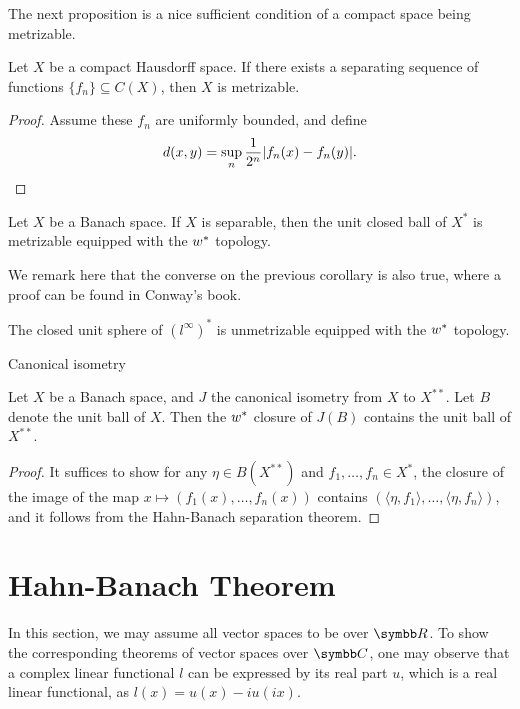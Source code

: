 The next proposition is a nice sufficient condition of a compact space being metrizable.

\begin{proposition}
  Let $X$ be a compact Hausdorff space. If there exists a separating sequence of functions $\{f_n\}\subseteq C(X)$, then $X$ is metrizable.
\end{proposition}

\begin{proof}
  Assume these $f_n$ are uniformly bounded, and define
  \begin{equation*}
    d(x, y)=\sup_{n} \frac{1}{2^n}\vert f_n(x)-f_n(y)\vert.
  \end{equation*}
\end{proof}

\begin{corollary}
  Let $X$ be a Banach space. If $X$ is separable, then the unit closed ball of $X^*$ is metrizable equipped with the $w^*$ topology.
\end{corollary}

We remark here that the converse on the previous corollary is also true, where a proof can be found in Conway's book.

\begin{example}
  The closed unit sphere of $(l^\infty)^*$ is unmetrizable equipped with the $w^*$ topology.
\end{example}

Canonical isometry

\begin{proposition}[Goldstein?]
  Let $X$ be a Banach space, and $J$ the canonical isometry from $X$ to $X^{**}$. Let $B$ denote the unit ball of $X$. Then the $w^*$ closure of $J(B)$ contains the unit ball of $X^{**}$.
\end{proposition}

\begin{proof}
  It suffices to show for any $\eta\in B(X^{**})$ and $f_1, \dotsc, f_n\in X^*$, the closure of the image of the map $x\mapsto (f_1(x), \dotsc, f_n(x))$ contains $(\langle\eta, f_1\rangle, \dotsc, \langle \eta, f_n\rangle)$, and it follows from the Hahn-Banach separation theorem.
\end{proof}

\section{Hahn-Banach Theorem}

In this section, we may assume all vector spaces to be over $\RR$. To show the corresponding theorems of vector spaces over $\CC$, one may observe that a complex linear functional $l$ can be expressed by its real part $u$, which is a real linear functional, as $l(x)=u(x)-iu(ix)$.

